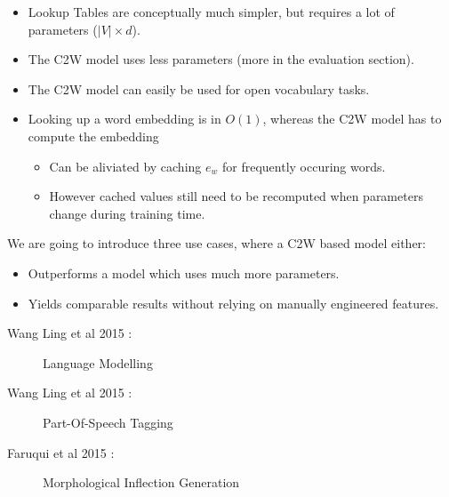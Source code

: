 \documentclass[11pt, a4paper, landscape]{article}
\begin{document}
\begin{itemize}
\item Lookup Tables are conceptually much simpler, but requires a lot of parameters ($|V| \times d$).
\item The C2W model uses less parameters (more in the evaluation section).
\item The C2W model can easily be used for open vocabulary tasks.
\item Looking up a word embedding is in $O(1)$, whereas the C2W model has to compute the embedding
  \begin{itemize}
  \item Can be aliviated by caching $e_w$ for frequently occuring words.
  \item However cached values still need to be recomputed when parameters change during training time.
  \end{itemize}
\end{itemize}
\vfill



\NewPage{}

\vfill
We are going to introduce three use cases, where a C2W based model either:
\begin{itemize}
\item Outperforms a model which uses much more parameters.
\item Yields comparable results without relying on manually engineered features.
\end{itemize}
\vfill
\begin{description}
\item [Wang Ling et al 2015 :] Language Modelling 
\item [Wang Ling et al 2015 :] Part-Of-Speech Tagging
\item [Faruqui et al 2015 :] Morphological Inflection Generation
\end{description}
\vfill


\NewPage{}
\end{document}
